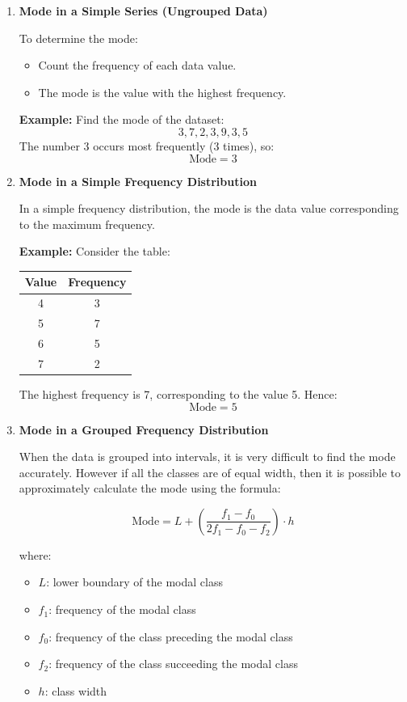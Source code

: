 \documentclass[twoside]{book}
\begin{document}
\begin{enumerate}

\item \textbf{Mode in a Simple Series (Ungrouped Data)}

To determine the mode:
\begin{itemize}
    \item Count the frequency of each data value.
    \item The mode is the value with the highest frequency.
\end{itemize}

\textbf{Example:} Find the mode of the dataset:
\[
3, 7, 2, 3, 9, 3, 5
\]
The number 3 occurs most frequently (3 times), so:
\[
\text{Mode} = 3
\]

\item \textbf{Mode in a Simple Frequency Distribution}

In a simple frequency distribution, the mode is the data value corresponding to the maximum frequency.

\textbf{Example:} Consider the table:

\begin{center}
\begin{tabular}{c|c}
\hline
Value & Frequency \\
\hline
4 & 3 \\
5 & 7 \\
6 & 5 \\
7 & 2 \\
\hline
\end{tabular}
\end{center}

The highest frequency is 7, corresponding to the value 5. Hence:
\[
\text{Mode} = 5
\]

\item \textbf{Mode in a Grouped Frequency Distribution}

When the data is grouped into intervals, it is very difficult to find the mode accurately. However if all the classes are of equal width, then it is possible to approximately calculate the mode using the formula:
\begin{textbox}
\[
\text{Mode} = L + \left( \frac{f_1 - f_0}{2f_1 - f_0 - f_2} \right) \cdot h
\]
    \end{textbox}

where:
\begin{itemize}
    \item \( L \): lower boundary of the modal class
    \item \( f_1 \): frequency of the modal class
    \item \( f_0 \): frequency of the class preceding the modal class
    \item \( f_2 \): frequency of the class succeeding the modal class
    \item \( h \): class width
\end{itemize}


\end{enumerate}
\end{document}
